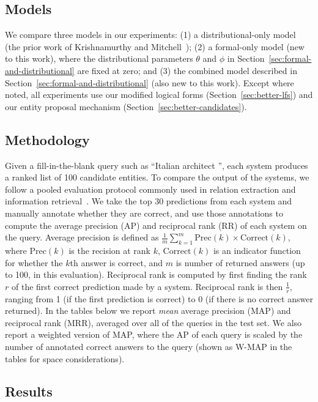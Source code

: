 \documentclass[11pt]{article}
\newcommand{\secref}[1]{Section~\ref{sec:#1}}
\newcommand{\blank}{\underline{\hspace{.5cm}}}
\begin{document}
\subsection{Models}

We compare three models in our experiments: (1) a distributional-only
model (the prior work of Krishnamurthy and
Mitchell~); (2)
a formal-only model (new to this work), where the distributional
parameters $\theta$ and $\phi$ in \secref{formal-and-distributional}
are fixed at zero; and (3) the combined model described in
\secref{formal-and-distributional} (also new to this work).  Except
where noted, all experiments use our modified logical forms
(\secref{better-lfs}) and our entity proposal mechanism
(\secref{better-candidates}).

\subsection{Methodology}

Given a fill-in-the-blank query such as ``Italian architect
\blank{}'', each system produces a ranked list of 100 candidate
entities.  To compare the output of the systems, we follow a pooled
evaluation protocol commonly used in relation extraction and
information
retrieval~\cite{west-2014-kbc-via-qa,riedel-2013-mf-universal-schema}.
We take the top 30 predictions from each system and manually annotate
whether they are correct, and use those annotations to compute the
average precision (AP) and reciprocal rank (RR) of each system on the
query.  Average precision is defined as $\frac{1}{m}\sum^m_{k=1}
\mathrm{Prec}(k) \times \mathrm{Correct}(k)$, where $\mathrm{Prec}(k)$
is the recision at rank $k$, $\mathrm{Correct}(k)$ is an indicator
function for whether the $k$th answer is correct, and $m$ is number of
returned answers (up to 100, in this evaluation).  Reciprocal rank is
computed by first finding the rank $r$ of the first correct prediction
made by a system.  Reciprocal rank is then $\frac{1}{r}$, ranging from
1 (if the first prediction is correct) to 0 (if there is no correct
answer returned).  In the tables below we report \emph{mean} average
precision (MAP) and reciprocal rank (MRR), averaged over all of the
queries in the test set.  We also report a weighted version of MAP,
where the AP of each query is scaled by the number of annotated
correct answers to the query (shown as W-MAP in the tables for space
considerations).

\subsection{Results}
\end{document}

